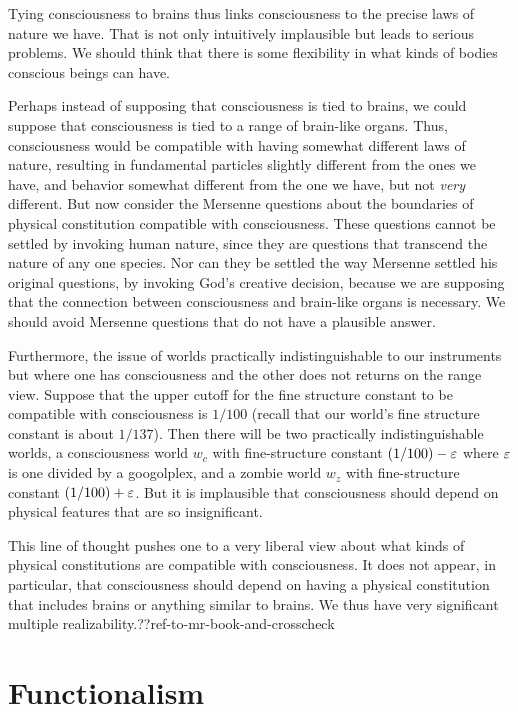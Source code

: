 Tying consciousness to brains thus links consciousness to the precise laws of nature we have. That is not only intuitively implausible
but leads to serious problems. We should think that there is some flexibility in what kinds of bodies conscious beings can have.

Perhaps instead of supposing that consciousness is tied to brains, we could suppose that consciousness is tied to a range of brain-like
organs. Thus, consciousness would be compatible with having somewhat different laws of nature, resulting in fundamental particles
slightly different from the ones we have, and behavior somewhat different from the one we have, but not \textit{very} different.
But now consider the Mersenne questions about the boundaries of physical constitution compatible with consciousness. These
questions cannot be settled by invoking human nature, since they are questions that transcend the nature of any one species.
Nor can they be settled the way Mersenne settled his original questions, by invoking God's creative decision, because we are
supposing that the connection between consciousness and brain-like organs is necessary. We should avoid Mersenne questions that
do not have a plausible answer. 

Furthermore, the issue of worlds practically indistinguishable to our instruments but where one has consciousness and the other
does not returns on the range view. Suppose that the upper cutoff for the fine structure constant to be compatible with
consciousness is $1/100$ (recall that our world's fine structure constant is about $1/137$). 
Then there will be two practically indistinguishable worlds, a consciousness world $w_c$ with fine-structure constant $(1/100)-\varepsilon$ where
$\varepsilon$ is one divided by a googolplex, and a zombie world $w_z$ with fine-structure constant $(1/100)+\varepsilon$.
But it is implausible that consciousness should depend on physical features that are so insignificant.

This line of thought pushes one to a very liberal view about what kinds of physical constitutions are compatible with consciousness.
It does not appear, in particular, that consciousness should depend on having a physical constitution that includes brains or anything
similar to brains. We thus have very significant multiple realizability.??ref-to-mr-book-and-crosscheck

\section{Functionalism}
